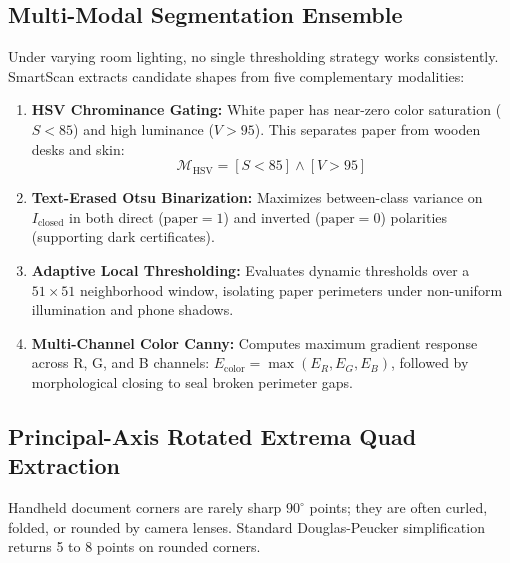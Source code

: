 \documentclass[11pt,a4paper]{article}
\begin{document}
\subsection{Multi-Modal Segmentation Ensemble}
Under varying room lighting, no single thresholding strategy works consistently. SmartScan extracts candidate shapes from five complementary modalities:
\begin{enumerate}[label=\textbf{M\arabic*:},leftmargin=2.2em,itemsep=0.15em]
    \item \textbf{HSV Chrominance Gating:} White paper has near-zero color saturation ($S < 85$) and high luminance ($V > 95$). This separates paper from wooden desks and skin:
    \begin{equation}
        \mathcal{M}_{\text{HSV}} = [S < 85] \land [V > 95]
    \end{equation}
    \item \textbf{Text-Erased Otsu Binarization:} Maximizes between-class variance on $I_{\text{closed}}$ in both direct ($\text{paper}=1$) and inverted ($\text{paper}=0$) polarities (supporting dark certificates).
    \item \textbf{Adaptive Local Thresholding:} Evaluates dynamic thresholds over a $51 \times 51$ neighborhood window, isolating paper perimeters under non-uniform illumination and phone shadows.
    \item \textbf{Multi-Channel Color Canny:} Computes maximum gradient response across R, G, and B channels: $E_{\text{color}} = \max(E_R, E_G, E_B)$, followed by morphological closing to seal broken perimeter gaps.
\end{enumerate}

\subsection{Principal-Axis Rotated Extrema Quad Extraction}
Handheld document corners are rarely sharp $90^\circ$ points; they are often curled, folded, or rounded by camera lenses. Standard Douglas-Peucker simplification returns 5 to 8 points on rounded corners.
\end{document}
